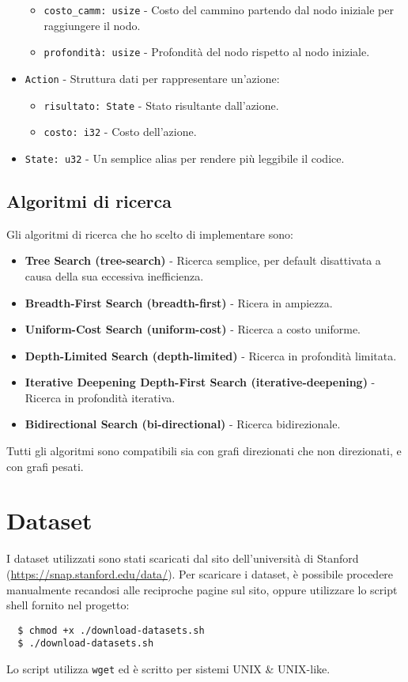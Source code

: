 \documentclass{ol-softwaremanual}
\begin{document}
\begin{itemize}
\begin{itemize}
		      \item \texttt{costo\_camm: usize} - Costo del cammino partendo dal nodo iniziale per raggiungere il nodo.
		      \item \texttt{profondità: usize} - Profondità del nodo rispetto al nodo iniziale.
	      \end{itemize}
	\item \texttt{Action} - Struttura dati per rappresentare un'azione:
	      \begin{itemize}
		      \item \texttt{risultato: State} - Stato risultante dall'azione.
		      \item \texttt{costo: i32} - Costo dell'azione.
	      \end{itemize}
	\item \texttt{State: u32} - Un semplice alias per rendere più leggibile il codice.
\end{itemize}
\newpage
\subsection{Algoritmi di ricerca}
Gli algoritmi di ricerca che ho scelto di implementare sono:
\begin{itemize}
	\item \textbf{Tree Search (tree-search)} - Ricerca semplice, per default disattivata a causa della sua eccessiva inefficienza.
	\item \textbf{Breadth-First Search (breadth-first)} - Ricera in ampiezza.
	\item \textbf{Uniform-Cost Search (uniform-cost)} - Ricerca a costo uniforme.
	\item \textbf{Depth-Limited Search (depth-limited)} - Ricerca in profondità limitata.
	\item \textbf{Iterative Deepening Depth-First Search (iterative-deepening)} - Ricerca in profondità iterativa.
	\item \textbf{Bidirectional Search (bi-directional)} - Ricerca bidirezionale.
\end{itemize}

Tutti gli algoritmi sono compatibili sia con grafi direzionati che non direzionati, e con grafi pesati.

\section{Dataset}\label{sec:dataset}
I dataset utilizzati sono stati scaricati dal sito dell'università di Stanford (\url{https://snap.stanford.edu/data/}).
Per scaricare i dataset, è possibile procedere manualmente recandosi alle reciproche pagine sul sito, oppure utilizzare lo script shell fornito nel progetto:
\begin{lstlisting}
  $ chmod +x ./download-datasets.sh
  $ ./download-datasets.sh
\end{lstlisting}
Lo script utilizza \texttt{wget} ed è scritto per sistemi UNIX \& UNIX-like.
\end{document}
